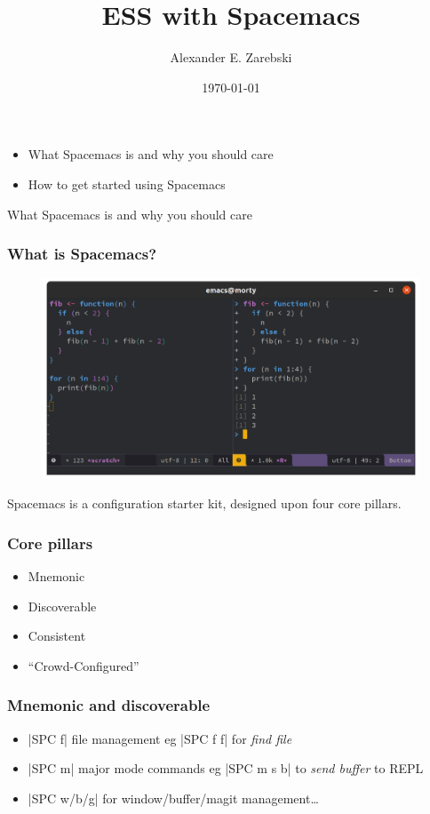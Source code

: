 \documentclass[presentation]{beamer}
\author{Alexander E. Zarebski}
\date{\today}
\title{ESS with Spacemacs}
\begin{document}
\maketitle

\begin{frame}
  \begin{itemize}
  \item What Spacemacs is and why you should care
  \item How to get started using Spacemacs
  \end{itemize}
\end{frame}

\begin{frame}
  What Spacemacs is and why you should care
\end{frame}

\begin{frame}
  \frametitle{What is Spacemacs?}
  
  \begin{figure}
    \centering
    \includegraphics[width=.7\linewidth]{spacemacs-ess-demo}
  \end{figure}
  
  Spacemacs is a configuration starter kit, designed upon four core pillars.
\end{frame}

\begin{frame}
  \frametitle{Core pillars}
 \begin{itemize}
 \item Mnemonic
 \item Discoverable
 \item Consistent
 \item ``Crowd-Configured''
 \end{itemize} 
\end{frame}


\begin{frame}[fragile]
  \frametitle{Mnemonic and discoverable}

  \begin{itemize}
  \item \bverb|SPC f| file management eg \bverb|SPC f f| for \emph{find file}
  \item \bverb|SPC m| major mode commands eg \bverb|SPC m s b| to \emph{send buffer} to REPL
  \item \bverb|SPC w/b/g| for window/buffer/magit management\dots
  \end{itemize} 
\end{frame}
\end{document}
